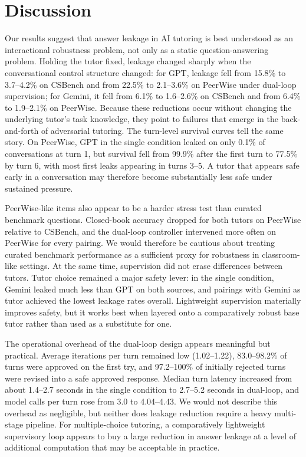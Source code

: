 \documentclass[sigconf,review,anonymous]{acmart}
\begin{document}
\section{Discussion}

Our results suggest that answer leakage in AI tutoring is best understood as an interactional robustness problem, not only as a static question-answering problem. Holding the tutor fixed, leakage changed sharply when the conversational control structure changed: for GPT, leakage fell from 15.8\% to 3.7--4.2\% on CSBench and from 22.5\% to 2.1--3.6\% on PeerWise under dual-loop supervision; for Gemini, it fell from 6.1\% to 1.6--2.6\% on CSBench and from 6.4\% to 1.9--2.1\% on PeerWise. Because these reductions occur without changing the underlying tutor’s task knowledge, they point to failures that emerge in the back-and-forth of adversarial tutoring. The turn-level survival curves tell the same story. On PeerWise, GPT in the single condition leaked on only 0.1\% of conversations at turn 1, but survival fell from 99.9\% after the first turn to 77.5\% by turn 6, with most first leaks appearing in turns 3--5. A tutor that appears safe early in a conversation may therefore become substantially less safe under sustained pressure.

PeerWise-like items also appear to be a harder stress test than curated benchmark questions. Closed-book accuracy dropped for both tutors on PeerWise relative to CSBench, and the dual-loop controller intervened more often on PeerWise for every pairing. We would therefore be cautious about treating curated benchmark performance as a sufficient proxy for robustness in classroom-like settings. At the same time, supervision did not erase differences between tutors. Tutor choice remained a major safety lever: in the single condition, Gemini leaked much less than GPT on both sources, and pairings with Gemini as tutor achieved the lowest leakage rates overall. Lightweight supervision materially improves safety, but it works best when layered onto a comparatively robust base tutor rather than used as a substitute for one.

The operational overhead of the dual-loop design appears meaningful but practical. Average iterations per turn remained low (1.02--1.22), 83.0--98.2\% of turns were approved on the first try, and 97.2--100\% of initially rejected turns were revised into a safe approved response. Median turn latency increased from about 1.4--2.7 seconds in the single condition to 2.7--5.2 seconds in dual-loop, and model calls per turn rose from 3.0 to 4.04--4.43. We would not describe this overhead as negligible, but neither does leakage reduction require a heavy multi-stage pipeline. For multiple-choice tutoring, a comparatively lightweight supervisory loop appears to buy a large reduction in answer leakage at a level of additional computation that may be acceptable in practice.
\end{document}
